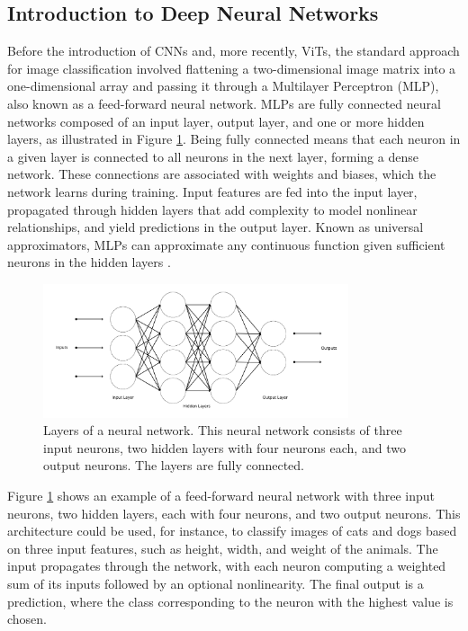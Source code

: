
\subsection{Introduction to Deep Neural Networks}
\label{sec:intro_DNN}
Before the introduction of CNNs and, more recently, ViTs, the standard approach for image classification involved flattening a two-dimensional image matrix into a one-dimensional array and passing it through a Multilayer Perceptron (MLP), also known as a feed-forward neural network. MLPs are fully connected neural networks composed of an input layer, output layer, and one or more hidden layers, as illustrated in Figure \ref{fig:dnn_layers}. Being fully connected means that each neuron in a given layer is connected to all neurons in the next layer, forming a dense network. These connections are associated with weights and biases, which the network learns during training. Input features are fed into the input layer, propagated through hidden layers that add complexity to model nonlinear relationships, and yield predictions in the output layer. Known as universal approximators, MLPs can approximate any continuous function given sufficient neurons in the hidden layers \cite{zhang2023dive,HORNIK1989359}.

\begin{figure}[ht]
    \centering
    \includegraphics[width=0.8\textwidth]{Images/cnn_layers.png} 
    \caption{Layers of a neural network. This neural network consists of three input neurons, two hidden layers with four neurons each, and two output neurons. The layers are fully connected.}
    \label{fig:dnn_layers}
\end{figure}

\noindent Figure \ref{fig:dnn_layers} shows an example of a feed-forward neural network with three input neurons, two hidden layers, each with four neurons, and two output neurons. This architecture could be used, for instance, to classify images of cats and dogs based on three input features, such as height, width, and weight of the animals. The input propagates through the network, with each neuron computing a weighted sum of its inputs followed by an optional nonlinearity. The final output is a prediction, where the class corresponding to the neuron with the highest value is chosen.


